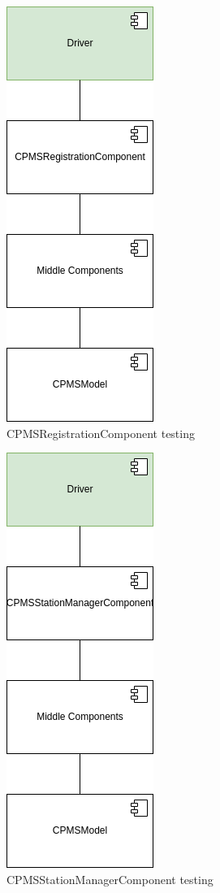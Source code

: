 \begin{figure}[H]
    \centering
    \includegraphics[keepaspectratio]{Testing/CPMS/cpms-CPMSRegistration.drawio.png}
    \caption{\ac{CPMS}RegistrationComponent testing}
\end{figure}
\begin{figure}[H]
    \centering
    \includegraphics[keepaspectratio]{Testing/CPMS/cpms-CPMSStationManager.drawio.png}
    \caption{\ac{CPMS}StationManagerComponent testing}
\end{figure}
